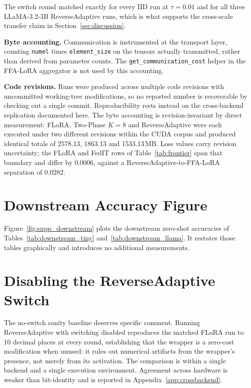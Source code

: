 The switch round matched exactly for every IID run at $\tau{=}0.01$ and for all three LLaMA-3.2-3B ReverseAdaptive runs, which is what supports the cross-scale transfer claim in Section~\ref{sec:discussion}.

\textbf{Byte accounting.} Communication is instrumented at the transport layer, counting \texttt{numel} times \texttt{element\_size} on the tensors actually transmitted, rather than derived from parameter counts. The \texttt{get\_communication\_cost} helper in the FFA-LoRA aggregator is not used by this accounting.

\textbf{Code revisions.} Runs were produced across multiple code revisions with uncommitted working-tree modifications, so no reported number is recoverable by checking out a single commit. Reproducibility rests instead on the cross-backend replication documented here. The byte accounting is revision-invariant by direct measurement: FLoRA, Two-Phase $K{=}8$ and ReverseAdaptive were each executed under two different revisions within the CUDA corpus and produced identical totals of 2578.13, 1863.13 and 1533.13\,MB. Loss values carry revision uncertainty; the FLoRA and FedIT rows of Table~\ref{tab:frontier} span that boundary and differ by 0.0006, against a ReverseAdaptive-to-FFA-LoRA separation of 0.0282.

\section{Downstream Accuracy Figure}
\label{app:downstream_figure}
Figure~\ref{fig:supp_downstream} plots the downstream zero-shot accuracies of
Tables~\ref{tab:downstream_tiny} and~\ref{tab:downstream_llama}. It restates those tables graphically and
introduces no additional measurements.

\section{Disabling the ReverseAdaptive Switch}
\label{app:noswitch}
The no-switch sanity baseline deserves specific comment. Running ReverseAdaptive with switching disabled reproduces the matched FLoRA \cite{wang2024flora} run to 10 decimal places at every round, establishing that the wrapper is a zero-cost modification when unused: it rules out numerical artifacts from the wrapper's presence, not merely from its activation. The comparison is within a single backend and a single execution environment. Agreement across hardware is weaker than bit-identity and is reported in Appendix~\ref{app:crossbackend}.

